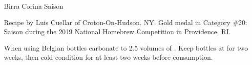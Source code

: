 \stylesection{\stylesaison}

\begin{recipe}{Birra Corina Saison}

\begin{aboutblock}
Recipe by Luis Cuellar of Croton-On-Hudson, NY. Gold medal in Category \#20:
Saison during the 2019 National Homebrew Competition in Providence, RI.
\sourceaha
\end{aboutblock}


\begin{methodandtiming}
 
\begin{mashsteps}
\end{mashsteps}

\begin{fermentationsteps}
\end{fermentationsteps}

\begin{directions}
When using Belgian bottles carbonate to 2.5 volumes of . Keep bottles
at  for two weeks, then cold condition for at least two weeks before
consumption.
\end{directions}

\end{methodandtiming}

\recipebreak

\begin{ingredientsblock}

\begin{malts}
\end{malts}

\begin{hops}
\end{hops}


\end{ingredientsblock}

\end{recipe}

